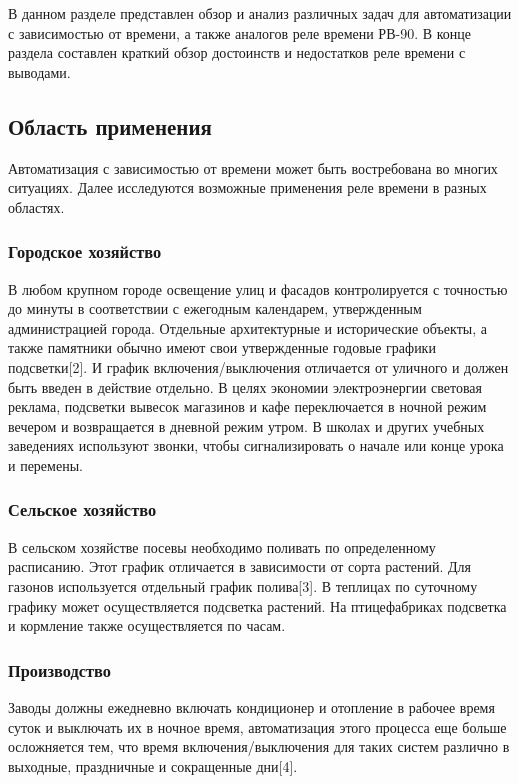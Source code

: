 В данном разделе представлен обзор и анализ различных задач для автоматизации с зависимостью от времени, а также аналогов реле времени РВ-90. В конце раздела составлен краткий обзор достоинств и недостатков реле времени с выводами.


\subsection{Область применения}
Автоматизация с зависимостью от времени может быть востребована во многих  ситуациях. Далее исследуются возможные применения реле времени в разных областях.

\subsubsection{Городское хозяйство}
В любом крупном городе освещение улиц и фасадов контролируется с точностью до минуты в соответствии с ежегодным календарем, утвержденным администрацией города. Отдельные архитектурные и исторические объекты, а также памятники обычно имеют свои утвержденные годовые графики подсветки[2]. И график включения/выключения отличается от уличного и должен быть введен в действие отдельно. В целях экономии электроэнергии световая реклама, подсветки вывесок магазинов и кафе переключается в ночной режим вечером и возвращается в дневной режим утром. В школах и других  учебных заведениях используют звонки, чтобы сигнализировать о начале или конце урока и перемены.


\subsubsection{Сельское хозяйство}
В сельском хозяйстве посевы необходимо поливать по определенному расписанию. Этот график отличается в зависимости от сорта растений. Для газонов используется отдельный график полива[3]. В теплицах по суточному графику может осуществляется подсветка растений. На птицефабриках подсветка и кормление также осуществляется по часам.


\subsubsection{Производство}
Заводы должны ежедневно включать кондиционер и отопление в рабочее время суток и выключать их в ночное время, автоматизация этого процесса еще больше осложняется тем, что время включения/выключения для таких систем различно в выходные, праздничные и сокращенные дни[4]. 


